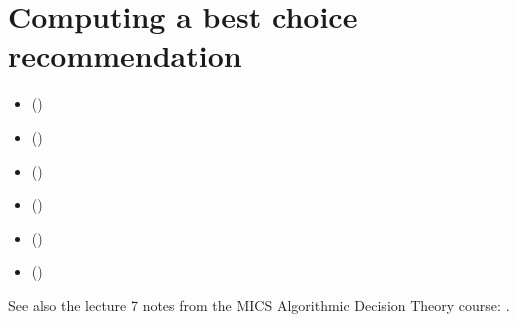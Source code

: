 \documentclass[a4paper,12pt,english]{sphinxhowto}
\begin{document}
\section{Computing a best choice recommendation}
\label{\detokenize{tutorial:computing-a-best-choice-recommendation}}\label{\detokenize{tutorial:rubis-tutorial-label}}
\begin{sphinxShadowBox}
\begin{itemize}
\item {} 
\label{\detokenize{tutorial:id273}}{\hyperref[\detokenize{tutorial:what-site-to-choose}]{}} ()

\item {} 
\label{\detokenize{tutorial:id274}}{\hyperref[\detokenize{tutorial:performance-tableau}]{}} ()

\item {} 
\label{\detokenize{tutorial:id275}}{\hyperref[\detokenize{tutorial:outranking-digraph}]{}} ()

\item {} 
\label{\detokenize{tutorial:id276}}{\hyperref[\detokenize{tutorial:rubis-best-choice-recommendations}]{}} ()

\item {} 
\label{\detokenize{tutorial:id277}}{\hyperref[\detokenize{tutorial:computing-strict-best-choice-recommendations}]{}} ()

\item {} 
\label{\detokenize{tutorial:id278}}{\hyperref[\detokenize{tutorial:weakly-ordering-the-outranking-digraph}]{}} ()

\end{itemize}
\end{sphinxShadowBox}

See also the lecture 7 notes from the MICS Algorithmic Decision Theory course: .
\end{document}
